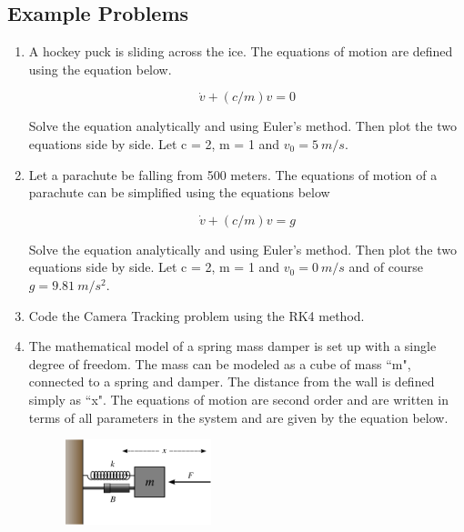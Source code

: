 \subsection{Example Problems}

\begin{enumerate}

\item A hockey puck is sliding across the ice. The equations of motion
  are defined using the equation below.

  \begin{equation}
    \dot{v} + (c/m)v = 0
  \end{equation}

  Solve the equation analytically and using Euler's method. Then plot
  the two equations side by side. Let c = 2, m = 1 and $v_0 = 5~m/s$.

\item Let a parachute be falling from 500 meters. The equations of
  motion of a parachute can be simplified using the equations below

  \begin{equation}
    \dot{v} + (c/m)v = g
  \end{equation}

  Solve the equation analytically and using Euler's method. Then plot
  the two equations side by side. Let c = 2, m = 1 and $v_0 = 0~m/s$
  and of course $g = 9.81~m/s^2$.
  
\item Code the Camera Tracking problem using the RK4 method. 

\item The mathematical model of a spring mass damper is set up with a single degree of
freedom. The mass can be modeled as a cube of mass ``m", connected
to a spring and damper. The distance from the wall is defined simply
as ``x". The equations of motion are second order and are written in terms of
all parameters in the system and are given by the equation below. 
\begin{figure}[htb]
  \begin{center}
    \includegraphics[width=0.4\textwidth]{Graphics/Mass-Spring-Damper.png}
  \end{center}
\end{figure}


\end{enumerate}
